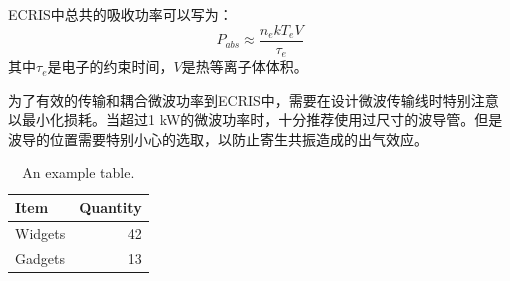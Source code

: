 \documentclass[fontset=windows]{article}
\begin{document}
ECRIS中总共的吸收功率可以写为：
\begin{equation}
    P_{abs}\approx\frac{n_ekT_eV}{\tau_e}
\end{equation}
其中$\tau_e$是电子的约束时间，$V$是热等离子体体积。

为了有效的传输和耦合微波功率到ECRIS中，需要在设计微波传输线时特别注意以最小化损耗。当超过1 kW的微波功率时，十分推荐使用过尺寸的波导管。但是波导的位置需要特别小心的选取，以防止寄生共振造成的出气效应。




































\clearpage

\begin{table}
\centering
\begin{tabular}{l|r}
Item & Quantity \\\hline
Widgets & 42 \\
Gadgets & 13
\end{tabular}
\caption{\label{tab:widgets}An example table.}
\end{table}



\end{document}
